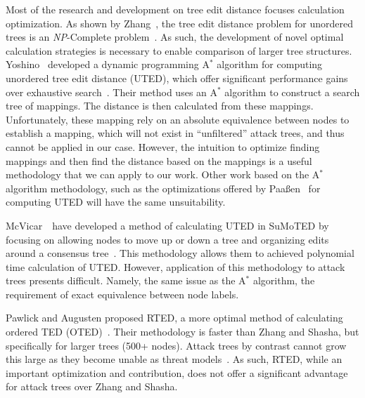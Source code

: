 Most of the research and development on tree edit distance focuses calculation optimization. As shown by Zhang~\etal, the tree edit distance problem for unordered trees is an \textit{NP}-Complete problem~\cite{zhang_editing_1992}. As such, the development of novel optimal calculation strategies is necessary to enable comparison of larger tree structures. Yoshino \etal\ developed a dynamic programming A$^*$ algorithm for computing unordered tree edit distance (UTED), which offer significant performance gains over exhaustive search~\cite{yoshino_dynamic_2013}. Their method uses an A$^*$ algorithm to construct a search tree of mappings. The distance is then calculated from these mappings. Unfortunately, these mapping rely on an absolute equivalence between nodes to establish a mapping, which will not exist in ``unfiltered'' attack trees, and thus cannot be applied in our case. However, the intuition to optimize finding mappings and then find the distance based on the mappings is a useful methodology that we can apply to our work. Other work based on the A$^*$ algorithm methodology, such as the optimizations offered by Paaßen~\cite{paasen_-algorithm_2021} for computing UTED will have the same unsuitability.

McVicar~\etal\ have developed a method of calculating UTED in SuMoTED by focusing on allowing nodes to move up or down a tree and organizing edits around a consensus tree~\cite{mcvicar_sumoted_2016}. This methodology allows them to achieved polynomial time calculation of UTED. However, application of this methodology to attack trees presents difficult. Namely, the same issue as the A$^*$ algorithm, the requirement of exact equivalence between node labels.


Pawlick and Augusten proposed RTED, a more optimal method of calculating ordered TED (OTED)~\cite{pawlik_rted_2011}. Their methodology is faster than Zhang and Shasha, but specifically for larger trees (500+ nodes). Attack trees by contrast cannot grow this large as they become unable as threat models~\cite{andersonSecurityEngineeringGuide2020}. As such, RTED, while an important optimization and contribution, does not offer a significant advantage for attack trees over Zhang and Shasha.

